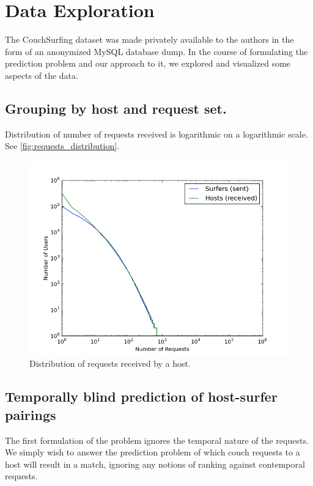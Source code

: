 \section{Data Exploration}

The CouchSurfing dataset was made privately available to the authors in the form of an anonymized MySQL database dump.
In the course of formulating the prediction problem and our approach to it, we explored and visualized some aspects of the data.

\subsection{Grouping by host and request set.}
Distribution of number of requests received is logarithmic on a logarithmic scale. 
See \autoref{fig:requests_distribution}.

\begin{figure}[ht]
\centering
\includegraphics[width=1\linewidth]{figures/req_received_dist2.png}
\caption{Distribution of requests received by a host. }
\label{fig:requests_distribution}
\end{figure}

\subsection{Temporally blind prediction of host-surfer pairings}
The first formulation of the problem ignores the temporal nature of the requests.
We simply wish to answer the prediction problem of which couch requests to a host will result in a match, ignoring any notions of ranking against contemporal requests.

